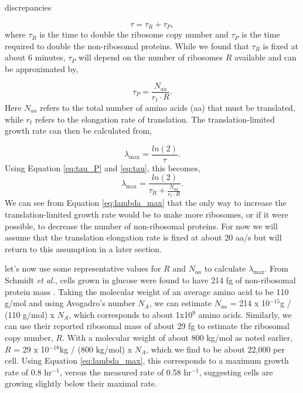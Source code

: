 discrepancies \documentclass[11pt, letterpaper]{article}
\begin{document}

\begin{equation}
	\tau = \tau_R + \tau_P,
\label{eq:tau}
\end{equation}
where $\tau_R$ is the time to double the ribosome copy number and $\tau_P$ is the time
required to double the non-ribosomal proteins. While we found that $\tau_R$ is fixed
at about 6 minutes,  $\tau_P$  will depend on the number of ribosomes $R$ available and
can be approximated by,

\begin{equation}
\tau_P = \frac{N_{aa}}{r_t \cdot R}.
\label{eq:tau_P}
\end{equation}
Here $N_{aa}$ refers to the total number of amino acids (aa) that must be
translated, while $r_t$ refers to the elongation rate of translation.
The translation-limited growth rate can then be calculated from,

\begin{equation}
\lambda_{\text{max}} =  \frac{ln(2)} {\tau}.
\end{equation}
Using Equation \ref{eq:tau_P} and \ref{eq:tau}, this becomes,
\begin{equation}
\lambda_{\text{max}} =  \frac{ln(2)} {\tau_R + \frac{N_{aa}}{r_t \cdot R}}.
\label{eq:lambda_max}
\end{equation}
We can see from Equation \ref{eq:lambda_max} that the only way to increase the
translation-limited growth rate would be to make more ribosomes, or if it were
possible, to decrease the number of non-ribosomal proteins. For now we will assume
that the translation elongation rate is fixed at about 20 aa/s but will return to this
assumption in a later section.

let's now use some representative values for $R$ and $N_{aa}$ to calculate
$\lambda_{\text{max}}$. From Schmidt {\it et al.}, cells grown in glucose were
found to have 214 fg of non-ribosomal  protein mass \cite{Schmidt2016}. Taking
the molecular weight of an average amino acid to be 110 g/mol and using Avogadro's number $N_A$, we can estimate
$N_{aa}$ = 214 x 10$^{-15}$g / (110 g/mol) x $N_A$,
which corresponds to about 1x10$^9$ amino acids.  Similarly, we can use their
reported ribosomal mass of about 29 fg to estimate the ribosomal copy number,
$R$. With a molecular weight of about 800 kg/mol as noted earlier,  $R$ =
29 x 10$^{-18}$kg / (800 kg/mol) x $N_A$,   which we find to be about 22,000 per
cell. Using Equation \ref{eq:lambda_max}, this corresponds to a maximum growth
rate of 0.8 hr$^{-1}$, versus the measured rate of 0.58 hr$^{-1}$, suggesting
cells are growing slightly below their maximal rate.
\end{document}
